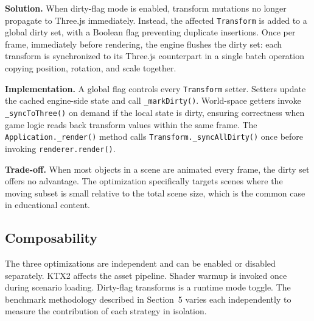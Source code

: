 \textbf{Solution.} When dirty-flag mode is enabled, transform mutations no longer propagate to Three.js immediately. Instead, the affected \texttt{Transform} is added to a global dirty set, with a Boolean flag preventing duplicate insertions. Once per frame, immediately before rendering, the engine flushes the dirty set: each transform is synchronized to its Three.js counterpart in a single batch operation copying position, rotation, and scale together.

\textbf{Implementation.} A global flag controls every \texttt{Transform} setter. Setters update the cached engine-side state and call \texttt{\_markDirty()}. World-space getters invoke \texttt{\_syncToThree()} on demand if the local state is dirty, ensuring correctness when game logic reads back transform values within the same frame. The \texttt{Application.\_render()} method calls \texttt{Transform.\_syncAllDirty()} once before invoking \texttt{renderer.render()}.

\textbf{Trade-off.} When most objects in a scene are animated every frame, the dirty set offers no advantage. The optimization specifically targets scenes where the moving subset is small relative to the total scene size, which is the common case in educational content.

\subsection{Composability}
The three optimizations are independent and can be enabled or disabled separately. KTX2 affects the asset pipeline. Shader warmup is invoked once during scenario loading. Dirty-flag transforms is a runtime mode toggle. The benchmark methodology described in Section~5 varies each independently to measure the contribution of each strategy in isolation.